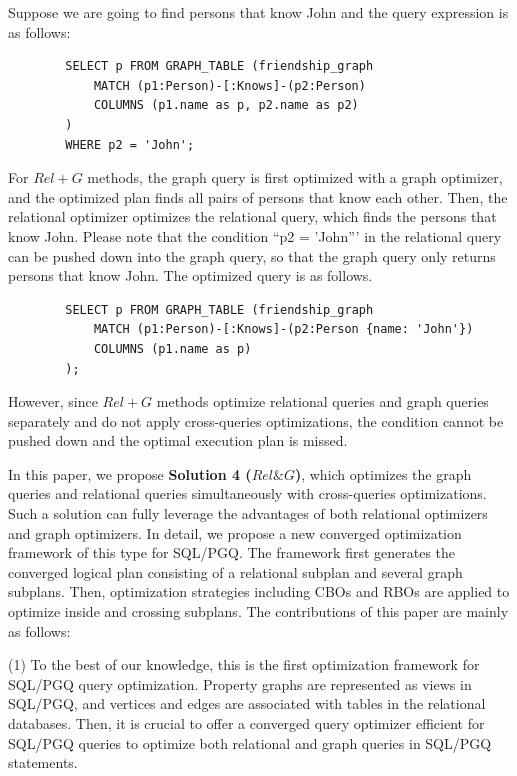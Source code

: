 {\begin{example}
    \label{example:push_down}
    Suppose we are going to find persons that know John and the query expression is as follows:
    \begin{lstlisting}
        SELECT p FROM GRAPH_TABLE (friendship_graph
            MATCH (p1:Person)-[:Knows]-(p2:Person)
            COLUMNS (p1.name as p, p2.name as p2)
        )
        WHERE p2 = 'John';
    \end{lstlisting}
    For $Rel+G$ methods, the graph query is first optimized with a graph optimizer, and the optimized plan finds all pairs of persons that know each other.
    Then, the relational optimizer optimizes the relational query, which finds the persons that know John.
    Please note that the condition ``p2 = 'John''' in the relational query can be pushed down into the graph query, so that the graph query only returns persons that know John.
    The optimized query is as follows.
    \begin{lstlisting}
        SELECT p FROM GRAPH_TABLE (friendship_graph
            MATCH (p1:Person)-[:Knows]-(p2:Person {name: 'John'})
            COLUMNS (p1.name as p)
        );
    \end{lstlisting}
    However, since $Rel+G$ methods optimize relational queries and graph queries separately and do not apply cross-queries optimizations, the condition cannot be pushed down and the optimal execution plan is missed.
\end{example}

In this paper, we propose \textbf{Solution 4 ($Rel\&G$)}, which optimizes the graph queries and relational queries simultaneously with cross-queries optimizations.
Such a solution can fully leverage the advantages of both relational optimizers and graph optimizers.
In detail, we propose a new converged optimization framework of this type for SQL/PGQ.
The framework first generates the converged logical plan consisting of a relational subplan and several graph subplans.
Then, optimization strategies including CBOs and RBOs are applied to optimize inside and crossing subplans.
The contributions of this paper are mainly as follows:

(1) To the best of our knowledge, this is the first optimization framework for SQL/PGQ query optimization.
Property graphs are represented as views in SQL/PGQ, and vertices and edges are associated with tables in the relational databases.
Then, it is crucial to offer a converged query optimizer efficient for SQL/PGQ queries to optimize both relational and graph queries in SQL/PGQ statements.

}
